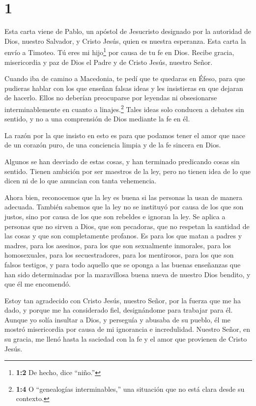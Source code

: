 \hypertarget{section}{%
\section{1}\label{section}}

 Esta carta viene de Pablo, un apóstol de Jesucristo
designado por la autoridad de Dios, nuestro Salvador, y Cristo Jesús,
quien es nuestra esperanza.  Esta carta la envío a Timoteo.
Tú eres mi hijo\footnote{\textbf{1:2} De hecho, dice ``niño.''} por
causa de tu fe en Dios. Recibe gracia, misericordia y paz de Dios el
Padre y de Cristo Jesús, nuestro Señor.

 Cuando iba de camino a Macedonia, te pedí que te quedaras
en Éfeso, para que pudieras hablar con los que enseñan falsas ideas y
les insistieras en que dejaran de hacerlo.  Ellos no
deberían preocuparse por leyendas ni obsesionarse interminablemente en
cuanto a linajes.\footnote{\textbf{1:4} O ``genealogías interminables,''
  una situación que no está clara desde su contexto.} Tales ideas solo
conducen a debates sin sentido, y no a una comprensión de Dios mediante
la fe en él.

 La razón por la que insisto en esto es para que podamos
tener el amor que nace de un corazón puro, de una conciencia limpia y de
la fe sincera en Dios.

 Algunos se han desviado de estas cosas, y han terminado
predicando cosas sin sentido.  Tienen ambición por ser
maestros de la ley, pero no tienen idea de lo que dicen ni de lo que
anuncian con tanta vehemencia.

 Ahora bien, reconocemos que la ley es buena si las personas
la usan de manera adecuada.  También sabemos que la ley no
se instituyó por causa de los que son justos, sino por causa de los que
son rebeldes e ignoran la ley. Se aplica a personas que no sirven a
Dios, que son pecadoras, que no respetan la santidad de las cosas y que
son completamente profanos. Es para los que matan a padres y madres,
para los asesinos,  para los que son sexualmente inmorales,
para los homosexuales, para los secuestradores, para los mentirosos,
para los que son falsos testigos, y para todo aquello que se oponga a
las buenas enseñanzas  que han sido determinadas por la
maravillosa buena nueva de nuestro Dios bendito, y que él me encomendó.

 Estoy tan agradecido con Cristo Jesús, nuestro Señor, por
la fuerza que me ha dado, y porque me ha considerado fiel, designándome
para trabajar para él.  Aunque yo solía insultar a Dios, y
perseguía y abusaba de su pueblo, él me mostró misericordia por causa de
mi ignorancia e incredulidad.  Nuestro Señor, en su gracia,
me llenó hasta la saciedad con la fe y el amor que provienen de Cristo
Jesús.

